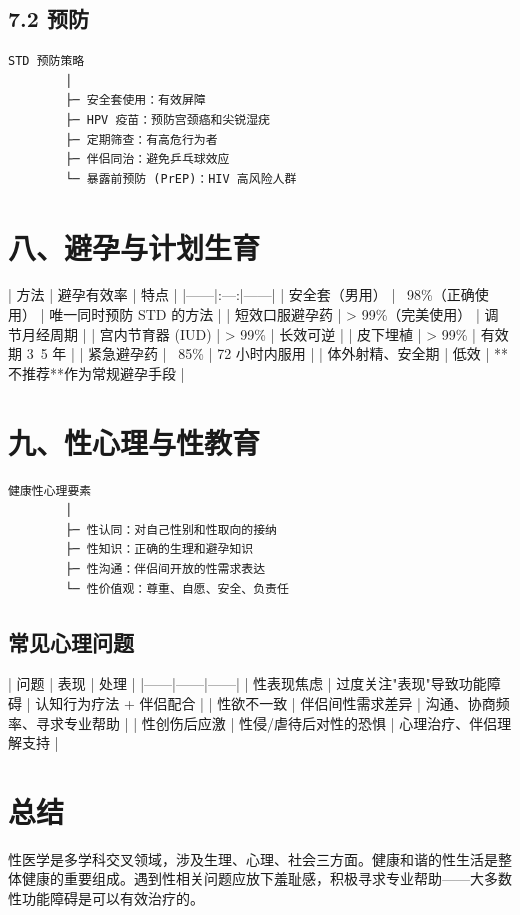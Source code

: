 \documentclass[12pt,UTF8,openany]{ctexbook}
\begin{document}
\subsection{7.2 预防}

\begin{verbatim}
STD 预防策略
        │
        ├─ 安全套使用：有效屏障
        ├─ HPV 疫苗：预防宫颈癌和尖锐湿疣
        ├─ 定期筛查：有高危行为者
        ├─ 伴侣同治：避免乒乓球效应
        └─ 暴露前预防 (PrEP)：HIV 高风险人群
\end{verbatim}

\hrulefill

\section{八、避孕与计划生育}

| 方法 | 避孕有效率 | 特点 |
|------|:---:|------|
| 安全套（男用） | ~98\%（正确使用） | 唯一同时预防 STD 的方法 |
| 短效口服避孕药 | > 99\%（完美使用） | 调节月经周期 |
| 宫内节育器 (IUD) | > 99\% | 长效可逆 |
| 皮下埋植 | > 99\% | 有效期 3~5 年 |
| 紧急避孕药 | ~85\% | 72 小时内服用 |
| 体外射精、安全期 | 低效 | **不推荐**作为常规避孕手段 |

\hrulefill

\section{九、性心理与性教育}

\begin{verbatim}
健康性心理要素
        │
        ├─ 性认同：对自己性别和性取向的接纳
        ├─ 性知识：正确的生理和避孕知识
        ├─ 性沟通：伴侣间开放的性需求表达
        └─ 性价值观：尊重、自愿、安全、负责任
\end{verbatim}

\subsection{常见心理问题}

| 问题 | 表现 | 处理 |
|------|------|------|
| 性表现焦虑 | 过度关注"表现"导致功能障碍 | 认知行为疗法 + 伴侣配合 |
| 性欲不一致 | 伴侣间性需求差异 | 沟通、协商频率、寻求专业帮助 |
| 性创伤后应激 | 性侵/虐待后对性的恐惧 | 心理治疗、伴侣理解支持 |

\hrulefill

\section{总结}

性医学是多学科交叉领域，涉及生理、心理、社会三方面。健康和谐的性生活是整体健康的重要组成。遇到性相关问题应放下羞耻感，积极寻求专业帮助——大多数性功能障碍是可以有效治疗的。
\end{document}
